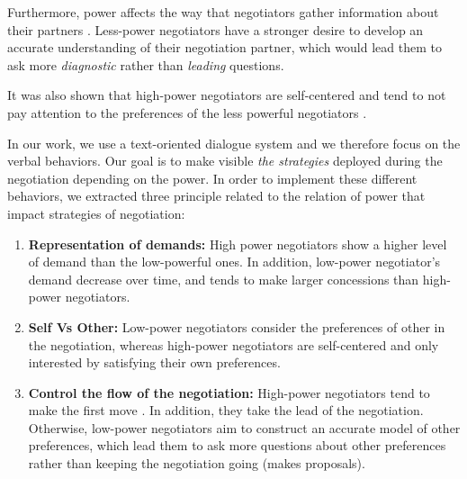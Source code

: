 \documentclass{llncs}
\begin{document}
	Furthermore, power affects the way that negotiators gather information about their partners \cite{de2004influence}. Less-power negotiators have a stronger desire to develop an accurate understanding of their negotiation partner, which would lead them to ask more \emph{diagnostic} rather than \emph{leading} questions.
	
	It was also shown that high-power negotiators are self-centered and tend to not pay attention to the preferences of the less powerful negotiators \cite{fiske1993controlling,de1995impact}.

	In our work, we use a text-oriented dialogue system and we therefore focus on the verbal behaviors. Our goal is to make visible \emph{the strategies} deployed during the negotiation depending on the power. In order to implement these different behaviors, we extracted three principle related to the relation of power that impact strategies of negotiation:
	\begin{enumerate}
	\item \textbf{Representation of demands:} High power negotiators show a higher level of demand than the low-powerful ones. In addition,  low-power negotiator's demand decrease over time, and tends to make larger concessions than high-power negotiators. \cite{de1995impact}
	
	\item \textbf{Self Vs Other:} Low-power negotiators consider the preferences of other in the negotiation, whereas high-power negotiators are self-centered and only interested by satisfying their own preferences. \cite{fiske1993controlling,de1995impact}
	
	\item \textbf{Control the flow of the negotiation:}
	High-power negotiators tend to make the first move \cite{magee2007power}. In addition, they take the lead of the negotiation. Otherwise, low-power negotiators aim to construct an accurate model of other preferences, which lead them to ask more questions about other preferences rather than keeping the negotiation going (makes proposals)\cite{de2004influence}. 
	
	\end{enumerate}
	
\end{document}
